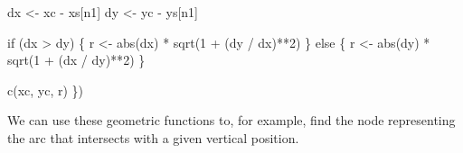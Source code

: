 \documentclass[
  letterpaper,
  DIV=11,
  numbers=noendperiod]{scrartcl}
\newenvironment{Shaded}{\begin{snugshade}}{\end{snugshade}}
\newcommand{\ControlFlowTok}[1]{\textcolor[rgb]{0.00,0.23,0.31}{#1}}
\newcommand{\DecValTok}[1]{\textcolor[rgb]{0.68,0.00,0.00}{#1}}
\newcommand{\FunctionTok}[1]{\textcolor[rgb]{0.28,0.35,0.67}{#1}}
\newcommand{\NormalTok}[1]{\textcolor[rgb]{0.00,0.23,0.31}{#1}}
\newcommand{\OtherTok}[1]{\textcolor[rgb]{0.00,0.23,0.31}{#1}}
\newcommand{\SpecialCharTok}[1]{\textcolor[rgb]{0.37,0.37,0.37}{#1}}
\begin{document}
\begin{Shaded}
\begin{Highlighting}[]
\NormalTok{  dx }\OtherTok{\textless{}{-}}\NormalTok{ xc }\SpecialCharTok{{-}}\NormalTok{ xs[n1]}
\NormalTok{  dy }\OtherTok{\textless{}{-}}\NormalTok{ yc }\SpecialCharTok{{-}}\NormalTok{ ys[n1]}

  \ControlFlowTok{if}\NormalTok{ (dx }\SpecialCharTok{\textgreater{}}\NormalTok{ dy) \{}
\NormalTok{    r }\OtherTok{\textless{}{-}} \FunctionTok{abs}\NormalTok{(dx) }\SpecialCharTok{*} \FunctionTok{sqrt}\NormalTok{(}\DecValTok{1} \SpecialCharTok{+}\NormalTok{ (dy }\SpecialCharTok{/}\NormalTok{ dx)}\SpecialCharTok{**}\DecValTok{2}\NormalTok{)}
\NormalTok{  \} }\ControlFlowTok{else}\NormalTok{ \{}
\NormalTok{    r }\OtherTok{\textless{}{-}} \FunctionTok{abs}\NormalTok{(dy) }\SpecialCharTok{*} \FunctionTok{sqrt}\NormalTok{(}\DecValTok{1} \SpecialCharTok{+}\NormalTok{ (dx }\SpecialCharTok{/}\NormalTok{ dy)}\SpecialCharTok{**}\DecValTok{2}\NormalTok{)}
\NormalTok{  \}}

  \FunctionTok{c}\NormalTok{(xc, yc, r)}
\NormalTok{\})}
\end{Highlighting}
\end{Shaded}

We can use these geometric functions to, for example, find the node
representing the arc that intersects with a given vertical position.
\end{document}
